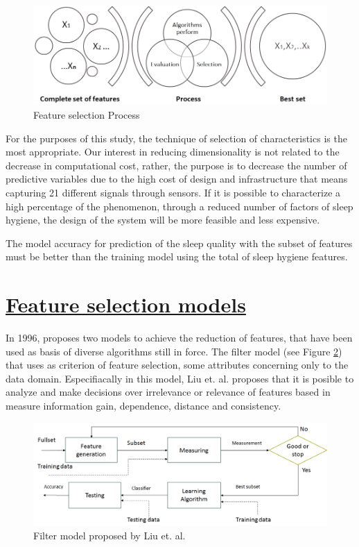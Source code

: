 \documentclass[]{book}
\begin{document}
\begin{figure}[H]

{\centering \includegraphics[width=0.8\linewidth]{images/feature-selection-process} 

}

\caption{Feature selection Process}\label{fig:feature-selection-process}
\end{figure}

For the purposes of this study, the technique of selection of
characteristics is the most appropriate. Our interest in reducing
dimensionality is not related to the decrease in computational cost,
rather, the purpose is to decrease the number of predictive variables
due to the high cost of design and infrastructure that means capturing
21 different signals through sensors. If it is possible to characterize
a high percentage of the phenomenon, through a reduced number of factors
of sleep hygiene, the design of the system will be more feasible and
less expensive.

The model accuracy for prediction of the sleep quality with the subset
of features must be better than the training model using the total of
sleep hygiene features.

\section{\texorpdfstring{\protect\hyperlink{feature-selection-model}{Feature
selection
models}}{Feature selection models}}\label{feature-selection-models}

In 1996, \citep{Liu1998} proposes two models to achieve the reduction of
features, that have been used as basis of diverse algorithms still in
force. The filter model (see Figure \ref{fig:filter-model}) that uses as
criterion of feature selection, some attributes concerning only to the
data domain. Especifiacally in this model, Liu et. al. proposes that it
is posible to analyze and make decisions over irrelevance or relevance
of features based in measure information gain, dependence, distance and
consistency.

\begin{figure}[H]

{\centering \includegraphics[width=0.6\linewidth]{images/filter-model} 

}

\caption{Filter model proposed by Liu et. al.}\label{fig:filter-model}
\end{figure}
\end{document}
